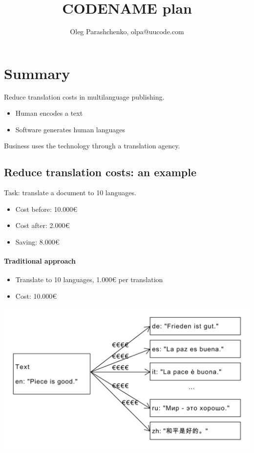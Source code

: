 \documentclass{article}
\title{CODENAME plan}
\author{Oleg Parashchenko, olpa@uucode.com}
\begin{document}
\maketitle

\tableofcontents

\section{Summary}
Reduce translation costs in multilanguage publishing.

\begin{itemize}
\item Human encodes a text
\item Software generates human languages
\end{itemize}

Business uses the technology through a translation agency.


\subsection{Reduce translation costs: an example}

Task: translate a document to 10 languages.

\begin{itemize}
\item Cost before: 10.000€
\item Cost after: 2.000€
\item Saving: 8.000€
\end{itemize}

\paragraph{Traditional approach}

\begin{itemize}
\item Translate to 10 languages, 1.000€ per translation
\item Cost: 10.000€
\end{itemize}

\includegraphics[scale=0.4]{dia/user-view-current-world.pdf}
\end{document}
